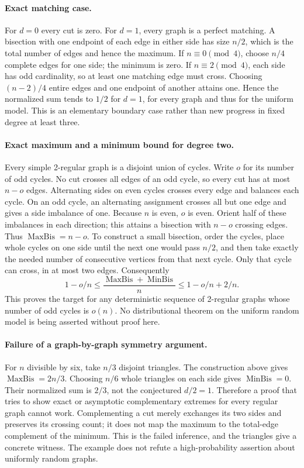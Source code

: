 \documentclass[11pt]{article}
\begin{document}
\paragraph{Exact matching case.}
For $d=0$ every cut is zero. For $d=1$, every graph is a perfect matching.
A bisection with one endpoint of each edge in either side has size $n/2$,
which is the total number of edges and hence the maximum.
If $n\equiv0\pmod4$, choose $n/4$ complete edges for one side; the minimum
is zero. If $n\equiv2\pmod4$, each side has odd cardinality, so at least
one matching edge must cross. Choosing $(n-2)/4$ entire edges and one
endpoint of another attains one. Hence the normalized sum tends to $1/2$
for $d=1$, for every graph and thus for the uniform model. This is an
elementary boundary case rather than new progress in fixed degree at least three.

\paragraph{Exact maximum and a minimum bound for degree two.}
Every simple 2-regular graph is a disjoint union of cycles. Write $o$ for
its number of odd cycles. No cut crosses all edges of an odd cycle, so
every cut has at most $n-o$ edges. Alternating sides on even cycles crosses
every edge and balances each cycle. On an odd cycle, an alternating assignment
crosses all but one edge and gives a side imbalance of one. Because $n$ is
even, $o$ is even. Orient half of these imbalances in each direction; this
attains a bisection with $n-o$ crossing edges. Thus $\operatorname{MaxBis}=n-o$.
To construct a small bisection, order the cycles, place whole cycles on one
side until the next one would pass $n/2$, and then take exactly the needed
number of consecutive vertices from that next cycle. Only that cycle can
cross, in at most two edges. Consequently
\[
1-o/n\le\frac{\operatorname{MaxBis}+\operatorname{MinBis}}n
\le1-o/n+2/n.
\]
This proves the target for any deterministic sequence of 2-regular graphs
whose number of odd cycles is $o(n)$. No distributional theorem on the
uniform random model is being asserted without proof here.

\paragraph{Failure of a graph-by-graph symmetry argument.}
For $n$ divisible by six, take $n/3$ disjoint triangles. The construction
above gives $\operatorname{MaxBis}=2n/3$. Choosing $n/6$ whole triangles
on each side gives $\operatorname{MinBis}=0$. Their normalized sum is
$2/3$, not the conjectured $d/2=1$. Therefore a proof that tries to show
exact or asymptotic complementary extremes for every regular graph cannot
work. Complementing a cut merely exchanges its two sides and preserves its
crossing count; it does not map the maximum to the total-edge complement
of the minimum. This is the failed inference, and the triangles give a
concrete witness. The example does not refute a high-probability assertion
about uniformly random graphs.
\end{document}
